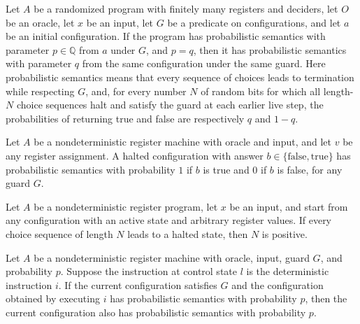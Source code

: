 \begin{lemma}
\label{Complexity.LogProg.PSem.congr}
\leanok
{}
Let $A$ be a randomized program with finitely many registers and deciders, let $O$ be an
oracle, let $x$ be an input, let $G$ be a predicate on configurations, and let $a$ be an
initial configuration. If the program has probabilistic semantics with parameter
$p\in\mathbb{Q}$ from $a$ under $G$, and $p=q$, then it has probabilistic semantics with
parameter $q$ from the same configuration under the same guard. Here probabilistic
semantics means that every sequence of choices leads to termination while respecting
$G$, and, for every number $N$ of random bits for which all length-$N$ choice sequences
halt and satisfy the guard at each earlier live step, the probabilities of returning
true and false are respectively $q$ and $1-q$.
\end{lemma}

\begin{lemma}
\label{Complexity.LogProg.PSem.halted}
\leanok
{}
Let $A$ be a nondeterministic register machine with oracle and input, and let $v$ be any
register assignment. A halted configuration with answer
$b\in\{\mathrm{false},\mathrm{true}\}$ has probabilistic semantics with probability $1$
if $b$ is true and $0$ if $b$ is false, for any guard $G$.
\end{lemma}

\begin{lemma}
\label{Complexity.LogProg.succ_of_nhalts}
\leanok
{}
Let $A$ be a nondeterministic register program, let $x$ be an input, and start from any
configuration with an active state and arbitrary register values. If every choice
sequence of length $N$ leads to a halted state, then $N$ is positive.
\end{lemma}

\begin{lemma}
\label{Complexity.LogProg.PSem.det}
\leanok
{}
Let $A$ be a nondeterministic register machine with oracle, input, guard $G$, and
probability $p$. Suppose the instruction at control state $l$ is the deterministic
instruction $i$. If the current configuration satisfies $G$ and the configuration
obtained by executing $i$ has probabilistic semantics with probability $p$, then the
current configuration also has probabilistic semantics with probability $p$.
\end{lemma}

